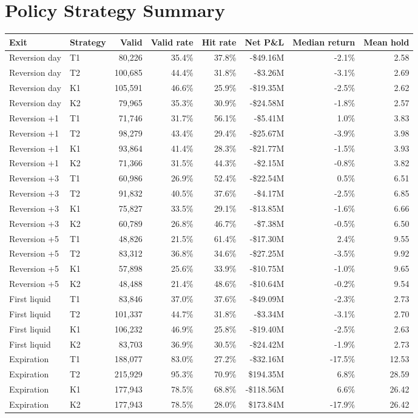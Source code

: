 \documentclass[11pt]{article}
\begin{document}
\section{Policy Strategy Summary}
\begin{tabular}{llrrrrrr}
\toprule
Exit & Strategy & Valid & Valid rate & Hit rate & Net P\&L & Median return & Mean hold \\
\midrule
Reversion day & T1 & 80,226 & 35.4\% & 37.8\% & -\$49.16M & -2.1\% & 2.58 \\
Reversion day & T2 & 100,685 & 44.4\% & 31.8\% & -\$3.26M & -3.1\% & 2.69 \\
Reversion day & K1 & 105,591 & 46.6\% & 25.9\% & -\$19.35M & -2.5\% & 2.62 \\
Reversion day & K2 & 79,965 & 35.3\% & 30.9\% & -\$24.58M & -1.8\% & 2.57 \\
Reversion +1 & T1 & 71,746 & 31.7\% & 56.1\% & -\$5.41M & 1.0\% & 3.83 \\
Reversion +1 & T2 & 98,279 & 43.4\% & 29.4\% & -\$25.67M & -3.9\% & 3.98 \\
Reversion +1 & K1 & 93,864 & 41.4\% & 28.3\% & -\$21.77M & -1.5\% & 3.93 \\
Reversion +1 & K2 & 71,366 & 31.5\% & 44.3\% & -\$2.15M & -0.8\% & 3.82 \\
Reversion +3 & T1 & 60,986 & 26.9\% & 52.4\% & -\$22.54M & 0.5\% & 6.51 \\
Reversion +3 & T2 & 91,832 & 40.5\% & 37.6\% & -\$4.17M & -2.5\% & 6.85 \\
Reversion +3 & K1 & 75,827 & 33.5\% & 29.1\% & -\$13.85M & -1.6\% & 6.66 \\
Reversion +3 & K2 & 60,789 & 26.8\% & 46.7\% & -\$7.38M & -0.5\% & 6.50 \\
Reversion +5 & T1 & 48,826 & 21.5\% & 61.4\% & -\$17.30M & 2.4\% & 9.55 \\
Reversion +5 & T2 & 83,312 & 36.8\% & 34.6\% & -\$27.25M & -3.5\% & 9.92 \\
Reversion +5 & K1 & 57,898 & 25.6\% & 33.9\% & -\$10.75M & -1.0\% & 9.65 \\
Reversion +5 & K2 & 48,488 & 21.4\% & 48.6\% & -\$10.64M & -0.2\% & 9.54 \\
First liquid & T1 & 83,846 & 37.0\% & 37.6\% & -\$49.09M & -2.3\% & 2.73 \\
First liquid & T2 & 101,337 & 44.7\% & 31.8\% & -\$3.34M & -3.1\% & 2.70 \\
First liquid & K1 & 106,232 & 46.9\% & 25.8\% & -\$19.40M & -2.5\% & 2.63 \\
First liquid & K2 & 83,703 & 36.9\% & 30.5\% & -\$24.42M & -1.9\% & 2.73 \\
Expiration & T1 & 188,077 & 83.0\% & 27.2\% & -\$32.16M & -17.5\% & 12.53 \\
Expiration & T2 & 215,929 & 95.3\% & 70.9\% & \$194.35M & 6.8\% & 28.59 \\
Expiration & K1 & 177,943 & 78.5\% & 68.8\% & -\$118.56M & 6.6\% & 26.42 \\
Expiration & K2 & 177,943 & 78.5\% & 28.0\% & \$173.84M & -17.9\% & 26.42 \\
\bottomrule
\end{tabular}
\end{document}
